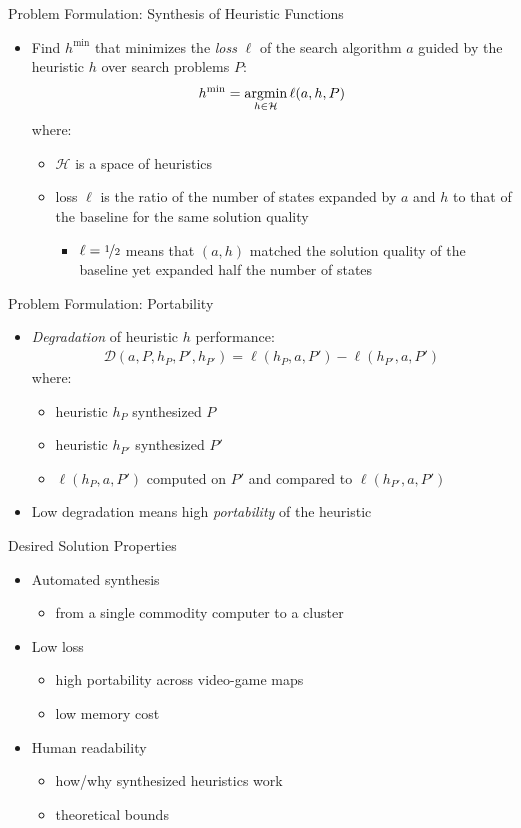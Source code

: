 \documentclass[aspectratio=169,usenames,dvipsnames]{beamer}
\newcommand{\bea}{\begin{eqnarray}}
\newcommand{\eea}{\end{eqnarray}}
\newcommand{\bei}{\begin{itemize}}
\newcommand{\eei}{\end{itemize}}
\newcommand{\ie}{\item}
\newcommand{\argmin}{\operatornamewithlimits{argmin}\limits}
\numberwithin{equation}{section}
\numberwithin{theorem}{section}
\numberwithin{lem}{section}
\numberwithin{df}{section}
\begin{document}

\begin{frame}{Problem Formulation: Synthesis of Heuristic Functions}

\bei

\ie Find $h^{\min}$ that minimizes the {\em loss} $\ell$ of the search algorithm $a$ guided by the heuristic $h$ over search problems $P$:
\bea 
h^{\min} = \argmin\limits_{h \in \mathcal{H}}  \ell(a,h,P) \nonumber 
\eea
where:
\bei

\ie $\mathcal{H}$ is a space of heuristics

\ie loss $\ell$ is the ratio of the number of states expanded by $a$ and $h$ to that of the baseline for the same solution quality
\bei
\ie $\ell = \nicefrac{1}{2}$ means that $(a,h)$ matched the solution quality of the baseline yet expanded half the number of states
\eei

\eei

\eei 

\end{frame}


\begin{frame}{Problem Formulation: Portability}

\bei

\ie {\em Degradation} of heuristic $h$ performance:
\bea  
\mathcal{D}(a,P,h_P,P',h_{P'}) = \ell(h_P,a,P') - \ell(h_{P'},a,P') \nonumber
\eea
where:
\bei
\ie heuristic $h_P$ synthesized $P$
\ie heuristic $h_{P'}$ synthesized $P'$
\ie $\ell(h_P,a,P')$ computed on $P'$ and compared to $\ell(h_{P'},a,P')$ 
\eei 

\bigskip

\ie Low degradation means high {\em portability} of the heuristic

\eei 

\end{frame}



\begin{frame}{Desired Solution Properties}

\bei

\ie Automated synthesis
\bei
\ie from a single commodity computer to a cluster
\eei

\medskip

\ie Low loss
\bei
\ie high portability across video-game maps
\ie low memory cost
\eei

\medskip

\ie Human readability
\bei
\ie how/why synthesized heuristics work
\ie theoretical bounds
\eei


\eei 

\end{frame}
\end{document}
